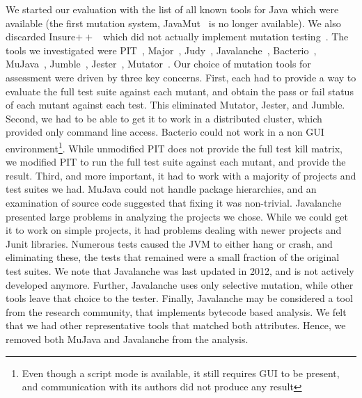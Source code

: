 \documentclass[conference]{IEEEtran}
\begin{document}
We started our evaluation with the list of all known tools for Java which were
available (the first mutation system, JavaMut~\cite{chevalley2003mutation}
is no longer available). We also discarded Insure$++$~\cite{insure} which did
not actually implement mutation testing~\cite{badinsure,badinsuremut}.
The tools we investigated were PIT~\cite{pitest},
Major~\cite{just2014the},
Judy~\cite{madeyski2010judy},
Javalanche~\cite{schuler2009javalanche},
Bacterio~\cite{usaola2012bacterio},
MuJava~\cite{ma2006mujava},
Jumble~\cite{irvine2007jumble},
Jester~\cite{moore2001jester},
Mutator~\cite{mutator}.
Our choice of mutation tools for assessment were driven by three key concerns.
First, each had to provide a way to evaluate the full test suite against each
mutant, and obtain the pass or fail status of each mutant against each test.
This eliminated Mutator, Jester, and Jumble.
Second, we had to be able to get it to work in a distributed cluster,
which provided only command line access. Bacterio could not work in a non
GUI environment\footnote{Even though a script mode is available, it still
requires GUI to be present, and communication with its authors did not produce
any result}. While unmodified PIT does not provide the full test kill matrix,
we modified PIT to run the full test suite against each mutant, and provide the
result.
Third, and more important, it had to work with a majority of projects
and test suites we had.
MuJava could not handle package hierarchies, and an examination of source code
suggested that fixing it was non-trivial.
Javalanche presented large problems in analyzing the projects we chose. While
we could get it to work on simple projects, it had problems dealing with newer
projects and Junit libraries. Numerous tests caused the JVM to
either hang or crash, and eliminating these, the tests that remained were a small
fraction of the original test suites. We note that Javalanche was last updated
in 2012, and is not actively developed anymore. Further, Javalanche uses
only selective mutation, while other tools leave that choice to the
tester. Finally, Javalanche may be considered a tool from the research
community, that implements bytecode based analysis. We felt that we had other
representative tools that matched both attributes. Hence, we removed both
MuJava and Javalanche from the analysis.
\end{document}
